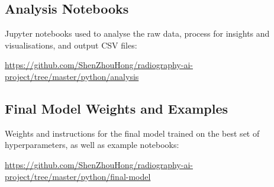 \subsection{Analysis Notebooks}

Jupyter notebooks used to analyse the raw data, process for insights and visualisations, and output CSV files:

\url{https://github.com/ShenZhouHong/radiography-ai-project/tree/master/python/analysis}

\subsection{Final Model Weights and Examples}

Weights and instructions for the final model trained on the best set of hyperparameters, as well as example notebooks:

\url{https://github.com/ShenZhouHong/radiography-ai-project/tree/master/python/final-model}